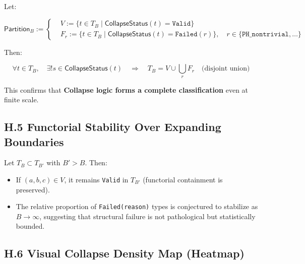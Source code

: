 \documentclass[11pt]{article}
\begin{document}
Let:

\[
\mathsf{Partition}_B := \left\{
\begin{aligned}
& V := \{ t \in T_B \mid \mathsf{CollapseStatus}(t) = \texttt{Valid} \} \\
& F_r := \{ t \in T_B \mid \mathsf{CollapseStatus}(t) = \texttt{Failed}(r) \},\quad r \in \{\texttt{PH\_nontrivial}, \ldots \}
\end{aligned}
\right.
\]

Then:

\[
\forall t \in T_B,\quad \exists! s \in \mathsf{CollapseStatus}(t)
\quad\Rightarrow\quad T_B = V \cup \bigcup_r F_r \quad\text{(disjoint union)}
\]

This confirms that \textbf{Collapse logic forms a complete classification} even at finite scale.

\subsection*{H.5 Functorial Stability Over Expanding Boundaries}

Let \( T_B \subset T_{B'} \) with \( B' > B \). Then:

\begin{itemize}
  \item If \( (a,b,c) \in V \), it remains \texttt{Valid} in \( T_{B'} \) (functorial containment is preserved).
  \item The relative proportion of \texttt{Failed(reason)} types is conjectured to stabilize as \( B \to \infty \),  
  suggesting that structural failure is not pathological but statistically bounded.
\end{itemize}

\subsection*{H.6 Visual Collapse Density Map (Heatmap)}

\begin{center}
\end{center}
\end{document}
